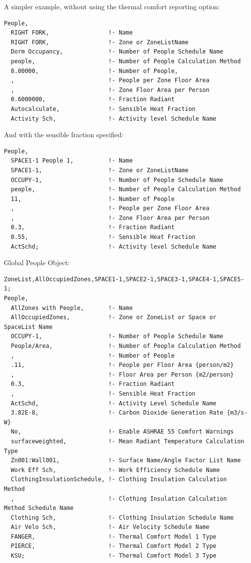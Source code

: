 A simpler example, without using the thermal comfort reporting option:

\begin{lstlisting}
People,
  RIGHT FORK,                 !- Name
  RIGHT FORK,                 !- Zone or ZoneListName
  Dorm Occupancy,             !- Number of People Schedule Name
  people,                     !- Number of People Calculation Method
  8.00000,                    !- Number of People,
  ,                           !- People per Zone Floor Area
  ,                           !- Zone Floor Area per Person
  0.6000000,                  !- Fraction Radiant
  Autocalculate,              !- Sensible Heat Fraction
  Activity Sch,               !- Activity level Schedule Name
\end{lstlisting}

And with the sensible fraction specified:

\begin{lstlisting}
People,
  SPACE1-1 People 1,          !- Name
  SPACE1-1,                   !- Zone or ZoneListName
  OCCUPY-1,                   !- Number of People Schedule Name
  people,                     !- Number of People Calculation Method
  11,                         !- Number of People
  ,                           !- People per Zone Floor Area
  ,                           !- Zone Floor Area per Person
  0.3,                        !- Fraction Radiant
  0.55,                       !- Sensible Heat Fraction
  ActSchd;                    !- Activity level Schedule Name
\end{lstlisting}

Global People Object:

\begin{lstlisting}
ZoneList,AllOccupiedZones,SPACE1-1,SPACE2-1,SPACE3-1,SPACE4-1,SPACE5-1;
People,
  AllZones with People,       !- Name
  AllOccupiedZones,           !- Zone or ZoneList or Space or SpaceList Name
  OCCUPY-1,                   !- Number of People Schedule Name
  People/Area,                !- Number of People Calculation Method
  ,                           !- Number of People
  .11,                        !- People per Floor Area {person/m2}
  ,                           !- Floor Area per Person {m2/person}
  0.3,                        !- Fraction Radiant
  ,                           !- Sensible Heat Fraction
  ActSchd,                    !- Activity Level Schedule Name
  3.82E-8,                    !- Carbon Dioxide Generation Rate {m3/s-W}
  No,                         !- Enable ASHRAE 55 Comfort Warnings
  surfaceweighted,            !- Mean Radiant Temperature Calculation Type
  Zn001:Wall001,              !- Surface Name/Angle Factor List Name
  Work Eff Sch,               !- Work Efficiency Schedule Name
  ClothingInsulationSchedule, !- Clothing Insulation Calculation Method
  ,                           !- Clothing Insulation Calculation Method Schedule Name
  Clothing Sch,               !- Clothing Insulation Schedule Name
  Air Velo Sch,               !- Air Velocity Schedule Name
  FANGER,                     !- Thermal Comfort Model 1 Type
  PIERCE,                     !- Thermal Comfort Model 2 Type
  KSU;                        !- Thermal Comfort Model 3 Type
\end{lstlisting}

